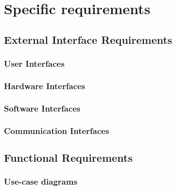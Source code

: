 



\chapter{Specific requirements}
	\section{External Interface Requirements}
		\subsection{User Interfaces}
		\subsection{Hardware Interfaces}
		\subsection{Software Interfaces}
		\subsection{Communication Interfaces}
	\section{Functional Requirements}
		\subsection{Use-case diagrams}
			
